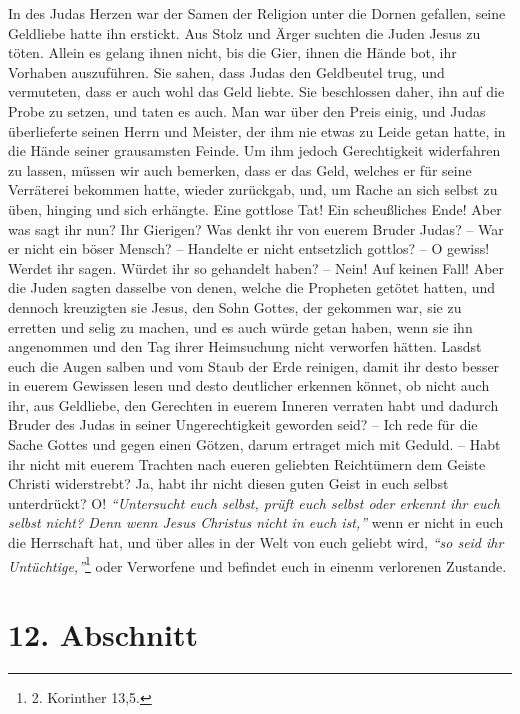 In des Judas Herzen war der Samen der Religion unter die Dornen gefallen, seine
Geldliebe hatte ihn erstickt. Aus Stolz und Ärger suchten die Juden Jesus zu
töten. Allein es gelang ihnen nicht, bis die Gier, ihnen die Hände bot, ihr
Vorhaben auszuführen. Sie sahen, dass Judas den Geldbeutel trug, und vermuteten, dass
er auch wohl das Geld liebte. Sie beschlossen daher, ihn auf die Probe zu
setzen, und taten es auch. Man war über den Preis einig, und Judas
überlieferte seinen Herrn und Meister, der ihm nie etwas zu Leide getan hatte,
in die Hände seiner grausamsten Feinde. Um ihm jedoch Gerechtigkeit widerfahren
zu lassen, müssen wir auch bemerken, dass er das Geld, welches er für seine
Verräterei bekommen hatte, wieder zurückgab, und, um Rache an sich selbst zu
üben, hinging und sich erhängte. Eine gottlose
Tat! Ein scheußliches Ende! Aber
was sagt ihr nun? Ihr Gierigen? Was denkt ihr von euerem Bruder Judas? -- War er
nicht ein böser Mensch? -- Handelte er nicht entsetzlich gottlos? -- O gewiss!
Werdet ihr sagen. Würdet ihr so gehandelt haben? -- Nein! Auf keinen Fall! Aber
die Juden sagten dasselbe von denen, welche die
Propheten getötet hatten, und
dennoch kreuzigten sie Jesus, den Sohn Gottes, der gekommen war, sie zu
erretten
und selig zu machen, und es auch würde getan haben, wenn sie ihn angenommen und
den Tag ihrer Heimsuchung nicht verworfen hätten. Lasdst euch
die Augen salben und vom Staub der Erde reinigen, damit ihr desto besser in euerem Gewissen
lesen und desto deutlicher erkennen könnet, ob nicht auch ihr, aus Geldliebe,
den Gerechten in euerem Inneren verraten habt und dadurch Bruder des Judas in
seiner Ungerechtigkeit geworden seid? -- Ich rede für die Sache Gottes und gegen
einen Götzen, darum ertraget mich mit Geduld. -- Habt ihr nicht
mit euerem
Trachten nach eueren geliebten Reichtümern dem Geiste Christi widerstrebt? Ja,
habt ihr nicht diesen guten Geist in euch selbst unterdrückt? O!
\textit{"`Untersucht
euch selbst, prüft euch selbst oder erkennt ihr euch selbst nicht? Denn wenn
Jesus Christus nicht in euch ist,"'}
wenn er nicht in euch die Herrschaft hat,
und über alles in der Welt von euch geliebt wird, \textit{"`so seid ihr
Untüchtige,"'}\footnote{2. Korinther 13,5.}
oder Verworfene und befindet euch in einenm
verlorenen Zustande.

\section{12. Abschnitt} \label{kap13_ab12}

